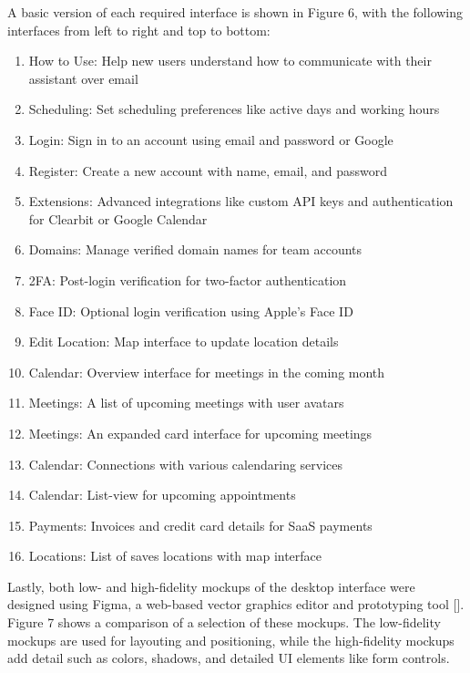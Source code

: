 \documentclass{article}
\begin{document}
 A basic version of each required interface is shown in Figure 6, with the following interfaces from left to right and top to bottom:
\begin{enumerate}
	\item How to Use: Help new users understand how to communicate with their assistant over email
	\item Scheduling: Set scheduling preferences like active days and working hours
	\item Login: Sign in to an account using email and password or Google
	\item Register: Create a new account with name, email, and password
	\item Extensions: Advanced integrations like custom API keys and authentication for Clearbit or Google Calendar
	\item Domains: Manage verified domain names for team accounts
	\item 2FA: Post-login verification for two-factor authentication
	\item Face ID: Optional login verification using Apple's Face ID
	\item Edit Location: Map interface to update location details
	\item Calendar: Overview interface for meetings in the coming month
	\item Meetings: A list of upcoming meetings with user avatars
	\item Meetings: An expanded card interface for upcoming meetings
	\item Calendar: Connections with various calendaring services
	\item Calendar: List-view for upcoming appointments
	\item Payments: Invoices and credit card details for SaaS payments
	\item Locations: List of saves locations with map interface
\end{enumerate}

Lastly, both low- and high-fidelity mockups of the desktop interface were designed using Figma, a web-based vector graphics editor and prototyping tool []. Figure 7 shows a comparison of a selection of these mockups. The low-fidelity mockups are used for layouting and positioning, while the high-fidelity mockups add detail such as colors, shadows, and detailed UI elements like form controls.
\end{document}
